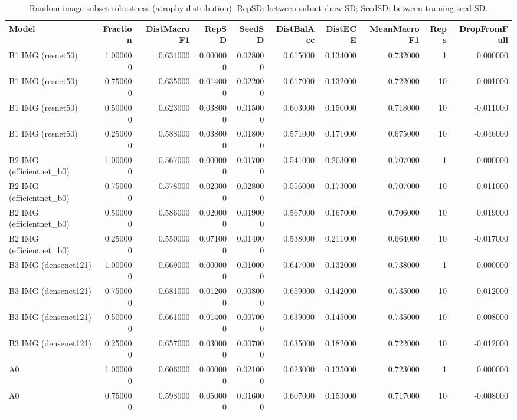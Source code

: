 \begin{table}
\caption{Random image-subset robustness (atrophy distribution). RepSD: between subset-draw SD; SeedSD: between training-seed SD.}
\label{tab:table6_missing_view}
\begin{tabular}{lrrrrrrrrr}
\toprule
Model & Fraction & DistMacroF1 & RepSD & SeedSD & DistBalAcc & DistECE & MeanMacroF1 & Reps & DropFromFull \\
\midrule
B1 IMG (resnet50) & 1.000000 & 0.634000 & 0.000000 & 0.028000 & 0.615000 & 0.134000 & 0.732000 & 1 & 0.000000 \\
B1 IMG (resnet50) & 0.750000 & 0.635000 & 0.014000 & 0.022000 & 0.617000 & 0.132000 & 0.722000 & 10 & 0.001000 \\
B1 IMG (resnet50) & 0.500000 & 0.623000 & 0.038000 & 0.015000 & 0.603000 & 0.150000 & 0.718000 & 10 & -0.011000 \\
B1 IMG (resnet50) & 0.250000 & 0.588000 & 0.038000 & 0.018000 & 0.571000 & 0.171000 & 0.675000 & 10 & -0.046000 \\
B2 IMG (efficientnet\_b0) & 1.000000 & 0.567000 & 0.000000 & 0.017000 & 0.541000 & 0.203000 & 0.707000 & 1 & 0.000000 \\
B2 IMG (efficientnet\_b0) & 0.750000 & 0.578000 & 0.023000 & 0.028000 & 0.556000 & 0.173000 & 0.707000 & 10 & 0.011000 \\
B2 IMG (efficientnet\_b0) & 0.500000 & 0.586000 & 0.020000 & 0.019000 & 0.567000 & 0.167000 & 0.706000 & 10 & 0.019000 \\
B2 IMG (efficientnet\_b0) & 0.250000 & 0.550000 & 0.071000 & 0.014000 & 0.538000 & 0.211000 & 0.664000 & 10 & -0.017000 \\
B3 IMG (densenet121) & 1.000000 & 0.669000 & 0.000000 & 0.010000 & 0.647000 & 0.132000 & 0.738000 & 1 & 0.000000 \\
B3 IMG (densenet121) & 0.750000 & 0.681000 & 0.012000 & 0.008000 & 0.659000 & 0.142000 & 0.735000 & 10 & 0.012000 \\
B3 IMG (densenet121) & 0.500000 & 0.661000 & 0.014000 & 0.007000 & 0.639000 & 0.145000 & 0.735000 & 10 & -0.008000 \\
B3 IMG (densenet121) & 0.250000 & 0.657000 & 0.030000 & 0.007000 & 0.635000 & 0.182000 & 0.722000 & 10 & -0.012000 \\
A0 & 1.000000 & 0.606000 & 0.000000 & 0.021000 & 0.623000 & 0.135000 & 0.723000 & 1 & 0.000000 \\
A0 & 0.750000 & 0.598000 & 0.050000 & 0.016000 & 0.607000 & 0.153000 & 0.717000 & 10 & -0.008000 \\

\end{tabular}
\end{table}
